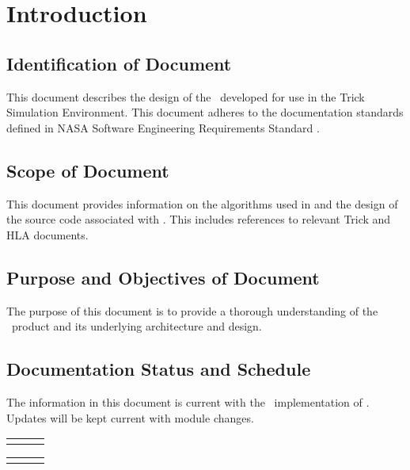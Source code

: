 %
%
%

\chapter{Introduction}\label{sec:intro}



\section{Identification of Document}
This document describes the design of the \TrickHLA\ developed
for use in the Trick Simulation Environment.
This document adheres to the documentation standards
defined in NASA Software Engineering Requirements Standard \cite{NASA:SWE}.

\section{Scope of Document}
This document provides information on the algorithms used in and
the design of the source code associated with \TrickHLA.
This includes references to relevant Trick and HLA documents.

\section{Purpose and Objectives of Document}
The purpose of this document is to provide a thorough understanding of the
\TrickHLA\ product and its underlying architecture and design.

\section{Documentation Status and Schedule}
The information in this document is current with the \TrickHLAid\
implementation of \TrickHLA. 
Updates will be kept current with module changes.

\begin{tabular}{||l|l|l|} \hline
\documentHistory
\end{tabular}

\begin{tabular}{||l|l|l|} \hline
\DocumentChangeHistory
\end{tabular}

